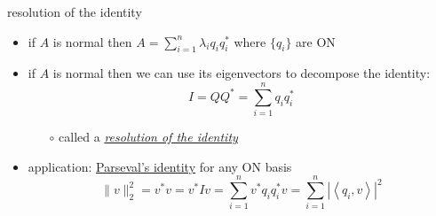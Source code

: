 \documentclass[10pt,hyperref]{beamer}
\newcommand{\ds}{\displaystyle}
\newcommand{\ip}[2]{\left<#1,#2\right>}
\begin{document}
\begin{frame}{resolution of the identity}

\begin{itemize}
\item if $A$ is normal then $\ds A = \sum_{i=1}^n \lambda_i q_i q_i^*$ where $\{q_i\}$ are ON
\item if $A$ is normal then we can use its eigenvectors to decompose the identity:
    $$I = Q Q^* = \sum_{i=1}^n q_i q_i^*$$

    \vspace{-2mm}
    \begin{itemize}
    \item[$\circ$] called a \href{https://en.wikipedia.org/wiki/Spectral_theory\#Resolution_of_the_identity}{\emph{resolution of the identity}}
    \end{itemize}
\item application: \href{https://en.wikipedia.org/wiki/Parseval's_identity}{Parseval's identity} for any ON basis
    $$\|v\|_2^2 = v^* v = v^* I v = \sum_{i=1}^n v^* q_i q_i^* v = \sum_{i=1}^n |\ip{q_i}{v}|^2$$
\end{itemize}
\end{frame}
\end{document}
